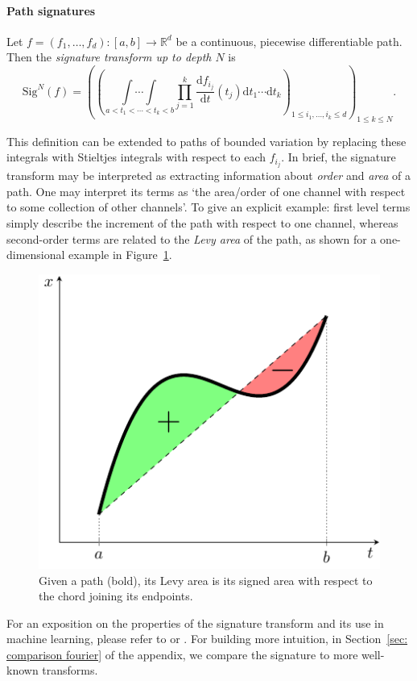 \documentclass{article}
\newcommand{\reals}{\mathbb{R}}
\newcommand{\sig}{\mathrm{Sig}^N}
\begin{document}
\paragraph{Path signatures}
Let $f = (f_1, \dots, f_d) \colon [a, b] \to \reals^d$ be a continuous, piecewise
differentiable path. Then the \emph{signature transform up to depth $N$}
is
\begin{equation}\label{eq:signature}
    \sig(f)=\left(\left(\underset{\,a<t_{1}<\cdots<t_{k}<b}{\int \cdots \int} \prod_{j=1}^{k} \frac{\mathrm{d} f_{i_{j}}}{\mathrm{d} t}\left(t_{j}\right) \mathrm{d} t_{1} \cdots \mathrm{d} t_{k}\right)_{1 \leq i_{1}, \ldots, i_{k} \leq d}\right)_{1 \leq k \leq N}.
\end{equation}

This definition can be extended to paths of bounded variation by
replacing these integrals with Stieltjes integrals with respect to each
$f_{i_j}$.
%
In brief, the signature transform may be interpreted as extracting
information about \emph{order} and \emph{area} of a path.
%
One may interpret its terms as `the area/order of one channel with
respect to some collection of other channels'. To give an explicit example: first level terms simply describe the increment of the path with respect to one channel, whereas second-order terms are related to the \emph{Levy area} of the path, as shown for a one-dimensional example in Figure~\ref{fig:sig_path}.

\begin{figure}
    \centering
    \vspace{-1em}
	\includegraphics[width=0.25\columnwidth]{figures/sig_path1.pdf}
	\caption{Given a path (bold), its Levy area is its signed area with respect to the chord joining its endpoints.}\label{fig:sig_path}
	\vspace{-2em}
\end{figure}

For an exposition on the properties of the signature transform and its use in machine learning, please refer to \citet{primer2016} or \citet[Appendix A]{kidger2019deep}. For building more intuition, in Section~\ref{sec: comparison fourier} of the appendix, we compare the signature to more well-known transforms.
\end{document}
